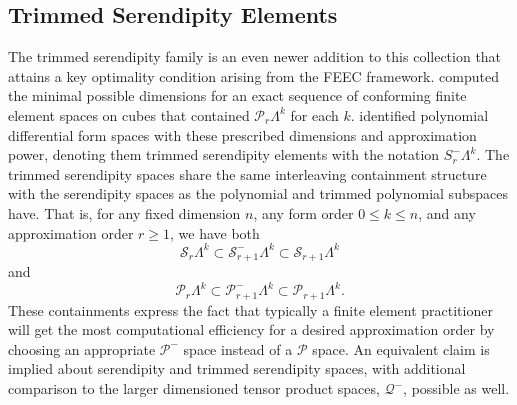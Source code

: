 \documentclass[format=acmsmall,screen,timestamp=false,a4paper]{acmart}
\DeclareMathOperator{\Div}{div}
\DeclareMathOperator{\curl}{curl}
\newcommand{\calP}{\mathcal{P}}
\newcommand{\calQ}{\mathcal{Q}}
\newcommand{\calS}{\mathcal{S}}
\newcommand{\hcurl}{\ensuremath{{H}(\curl)}\xspace}
\newcommand{\hdiv}{\ensuremath{{H}(\Div)}\xspace}
\begin{document}
\begin{table}[htbp]
\label{tab:tsfamily}
\end{table}


 
 
    
\subsection{Trimmed Serendipity Elements}
    The trimmed serendipity family is an even newer addition to this collection that attains a key optimality condition arising from the FEEC framework.
	\citet{christiansen2016constructions} computed the minimal possible dimensions for an exact sequence of conforming finite element spaces on cubes that contained $\calP_r\Lambda^k$ for each $k$.
	\citet{gillette2019trimmed} identified polynomial differential form spaces with these prescribed dimensions and approximation power, denoting them trimmed serendipity elements with the notation $S^-_r\Lambda^k$.  
	The trimmed serendipity spaces share the same interleaving containment structure with the serendipity spaces as the polynomial and trimmed polynomial subspaces have.  That is, for any fixed dimension $n$, any form order $0\leq k\leq n$, and any approximation order $r\geq 1$, we have both
\begin{equation*}
      \calS_r \Lambda^k \subset \calS^-_{r+1} \Lambda^k \subset \calS_{r+1} \Lambda^k
  \end{equation*}
  and   
   \begin{equation*}
      \calP_r \Lambda^k \subset \calP^-_{r+1} \Lambda^k \subset \calP_{r+1} \Lambda^k.
  \end{equation*}
	These containments express the fact that typically a finite element practitioner will get the most computational efficiency for a desired approximation order by choosing an appropriate $\calP^-$ space instead of a $\calP$ space.
	An equivalent claim is implied about serendipity and trimmed serendipity spaces, with additional comparison to the larger dimensioned tensor product spaces, $\calQ^-$, possible as well.
\end{document}
